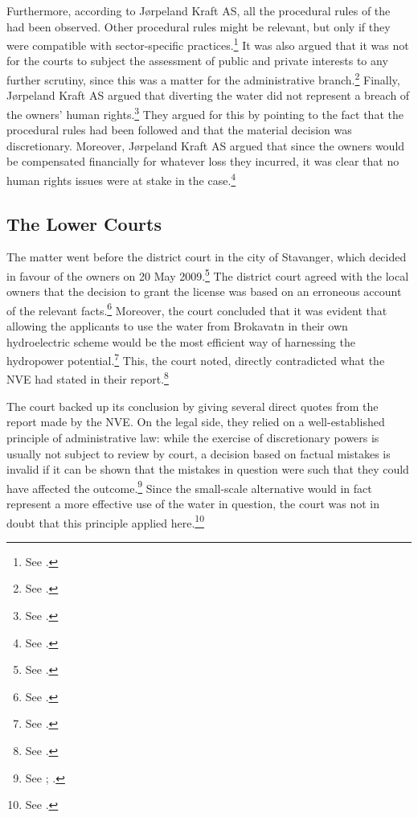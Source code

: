 Furthermore, according to Jørpeland Kraft AS, all the procedural rules of the \cite{wra17} had been observed. Other procedural rules might be relevant, but only if they were compatible with sector-specific practices.\footnote{See \cite[16]{jorpeland11}.} It was also argued that it was not for the courts to subject the assessment of public and private interests to any further scrutiny, since this was a matter for the administrative branch.\footnote{See \cite[2]{jorpeland11a}.} Finally, Jørpeland Kraft AS argued that diverting the water did not represent a breach of the owners' human rights.\footnote{See \cite[2]{jorpeland11a}.} They argued for this by pointing to the fact that the procedural rules had been followed and that the material decision was discretionary. Moreover, Jørpeland Kraft AS argued that since the owners would be compensated financially for whatever loss they incurred, it was clear that no human rights issues were at stake in the case.\footnote{See \cite[2]{jorpeland11a}.}

\subsection{The Lower Courts}\label{sec:5:6:3}

The matter went before the district court in the city of Stavanger, which decided in favour of the owners on 20 May 2009.\footnote{See \cite{jorpeland09}.} The district court agreed with the local  owners that the decision to grant the license was based on an erroneous account of the relevant facts.\footnote{See \cite[25]{jorpeland11}.} Moreover, the court concluded that it was evident that allowing the applicants to use the water from Brokavatn in their own hydroelectric scheme would be the most efficient way of harnessing the hydropower potential.\footnote{See \cite[22-23]{jorpeland09}.} This, the court noted, directly contradicted what the NVE had stated in their report.\footnote{See \cite[23]{jorpeland09}.}

The court backed up its conclusion by giving several direct quotes from the report made by the NVE. On the legal side, they relied on a well-established principle of administrative law: while the exercise of discretionary powers is usually not subject to review by court, a decision based on factual mistakes is invalid if it can be shown that the mistakes in question were such that they could have affected the outcome.\footnote{See \dni\cite[41]{paa67}; \cite[407-410]{eckhoff14}.} Since the small-scale alternative would in fact represent a more effective use of the water in question, the court was not in doubt that this principle applied here.\footnote{See \cite[25]{jorpeland09}.}

